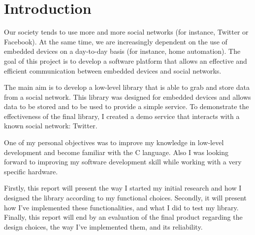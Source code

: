 \chapter{Introduction}

\hspace{15mm}Our society tends to use more and more social networks (for instance, Twitter or Facebook). At the same time, we are increasingly dependent on the use of embedded devices on a day-to-day basis (for instance, home automation). The goal of this project is to develop a software platform that allows an effective and efficient communication between embedded devices and social networks.

The main aim is to develop a low-level library that is able to grab and store data from a social network. This library was designed for embedded devices and allows data to be stored and to be used to provide a simple service. To demonstrate the effectiveness of the final library, I created a demo service that interacts with a known social network: Twitter.

One of my personal objectives was to improve my knowledge in low-level development and become familiar with the C language. Also I was looking forward to improving my software development skill while working with a very specific hardware.

Firstly, this report will present the way I started my initial research and how I designed the library according to my functional choices. Secondly, it will present how I've implemented these functionalities, and what I did to test my library. Finally, this report will end by an evaluation of the final product regarding the design choices, the way I've implemented them, and its reliability.


\clearpage
